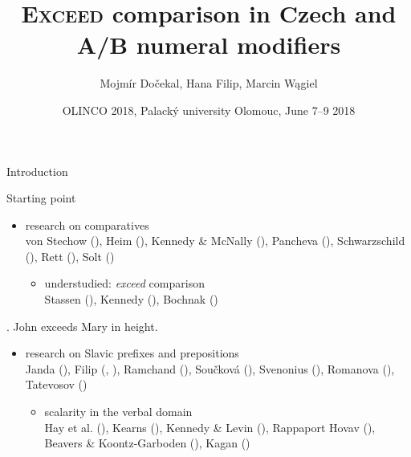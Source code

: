 \documentclass[12pt]{beamer}
\title{\textsc{Exceed} comparison in Czech and A/B numeral modifiers}
\author{Mojmír Dočekal, Hana Filip, Marcin Wągiel}
\date{OLINCO 2018, Palacký university Olomouc, June 7--9  2018}
\begin{document}
	\frame{\titlepage}
	

\begin{frame}{Introduction}

Starting point

\begin{itemize}
\item research on comparatives\\
\scriptsize von Stechow (\citeyear{von_stechow1984comparing}), Heim (\citeyear{heim2000degree}), Kennedy \& McNally (\citeyear{kennedy_mcnally2005scale}), Pancheva (\citeyear{pancheva2006phrasal}), Schwarzschild (\citeyear{schwarzschild2008semantics}), Rett (\citeyear{rett2008degree}), Solt (\citeyear{solt2009semantics})\normalsize
\vspace{0.666em}
\begin{itemize}
\item understudied: \textit{exceed} comparison\\
\scriptsize Stassen (\citeyear{stassen1985comparison}), Kennedy (\citeyear{kennedy2005variation}), Bochnak (\citeyear{bochnak2013crosslinguistic})\normalsize
\end{itemize}
\end{itemize}

\ex. John exceeds Mary in height.

\begin{itemize}
\item research on Slavic prefixes and prepositions\\
\scriptsize Janda (\citeyear{janda1985meaning}), Filip (\citeyear{filip2000quantization}, \citeyear{filip2008events}), Ramchand (\citeyear{ramchand2004time}), Součková (\citeyear{souckova2004there}), Svenonius (\citeyear{svenonius2004slavic}), Romanova (\citeyear{romanova2006constructing}), Tatevosov (\citeyear{tatevosov2004slavic})\normalsize
\vspace{0.666em}
\begin{itemize}
\item scalarity in the verbal domain\\
\scriptsize Hay et al. (\citeyear{hay_kennedy_levin1999scalar}), Kearns (\citeyear{kearns2007telic}), Kennedy \& Levin (\citeyear{kennedy_levin2008measure}), Rappaport Hovav (\citeyear{rappaport-hovav2008lexicalized}), Beavers \& Koontz-Garboden (\citeyear{beavers_koontz-garboden2012manner}), Kagan (\citeyear{kagan2013scalarity})\normalsize
\end{itemize}
\end{itemize}

\end{frame}
\end{document}
